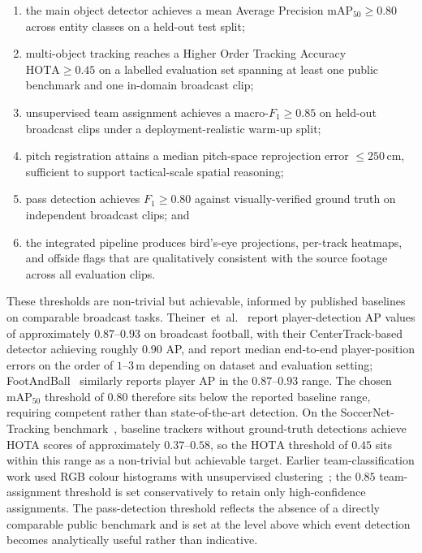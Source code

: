 \begin{enumerate}[label=(\roman*),leftmargin=2.2em]
    \item the main object detector achieves a mean Average Precision
    $\mathrm{mAP}_{50} \geq 0.80$ across entity classes on a held-out test
    split;

    \item multi-object tracking reaches a Higher Order Tracking Accuracy
    $\mathrm{HOTA} \geq 0.45$ on a labelled evaluation set spanning at least
    one public benchmark and one in-domain broadcast clip;

    \item unsupervised team assignment achieves a macro-$F_1 \geq 0.85$ on
    held-out broadcast clips under a deployment-realistic warm-up split;

    \item pitch registration attains a median pitch-space reprojection error
    $\leq 250$\,cm, sufficient to support tactical-scale spatial reasoning;

    \item pass detection achieves $F_1 \geq 0.80$ against
    visually-verified ground truth on independent broadcast clips; and

    \item the integrated pipeline produces bird's-eye projections, per-track
    heatmaps, and offside flags that are qualitatively consistent with the
    source footage across all evaluation clips.
\end{enumerate}

These thresholds are non-trivial but achievable, informed by published
baselines on comparable broadcast tasks. Theiner~et~al.\
\cite{Theiner2022} report player-detection AP values of approximately
$0.87$--$0.93$ on broadcast football, with their CenterTrack-based
detector achieving roughly $0.90$ AP, and report median end-to-end
player-position errors on the order of $1$--$3$\,m depending on
dataset and evaluation setting; FootAndBall~\cite{Komorowski2020FootAndBall}
similarly reports player AP in the $0.87$--$0.93$ range. The chosen
$\mathrm{mAP}_{50}$ threshold of $0.80$ therefore sits below the
reported baseline range, requiring competent rather than
state-of-the-art detection. On the SoccerNet-Tracking
benchmark~\cite{Cioppa2022}, baseline trackers without ground-truth
detections achieve HOTA scores of approximately $0.37$--$0.58$, so
the $\mathrm{HOTA}$ threshold of $0.45$ sits within this range as a
non-trivial but achievable target. Earlier team-classification work
used RGB colour histograms with unsupervised
clustering~\cite{Spagnolo2007}; the $0.85$ team-assignment threshold
is set conservatively to retain only high-confidence assignments.
The pass-detection threshold reflects the absence of a directly
comparable public benchmark and is set at the level above which
event detection becomes analytically useful rather than indicative.

